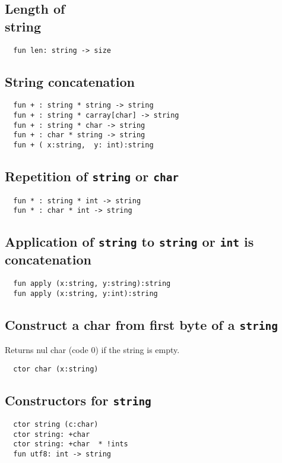 \documentclass[oneside]{book}
\begin{document}
\subsection{Length of {\\ string}}
\begin{verbatim}
  fun len: string -> size
\end{verbatim}

\subsection{String concatenation}
\begin{verbatim}
  fun + : string * string -> string
  fun + : string * carray[char] -> string
  fun + : string * char -> string
  fun + : char * string -> string
  fun + ( x:string,  y: int):string
\end{verbatim}

\subsection{Repetition of {\tt string} or {\tt char}}
\begin{verbatim}
  fun * : string * int -> string
  fun * : char * int -> string
\end{verbatim}

\subsection{Application of {\tt string} to {\tt string} or {\tt int} is concatenation}
\begin{verbatim}
  fun apply (x:string, y:string):string
  fun apply (x:string, y:int):string
\end{verbatim}

\subsection{Construct a char from first byte of a {\tt string}}
Returns nul char (code 0) if the string is empty.

\begin{verbatim}
  ctor char (x:string)
\end{verbatim}

\subsection{Constructors for {\tt string}}
\begin{verbatim}
  ctor string (c:char)
  ctor string: +char 
  ctor string: +char  * !ints
  fun utf8: int -> string
\end{verbatim}
\end{document}
